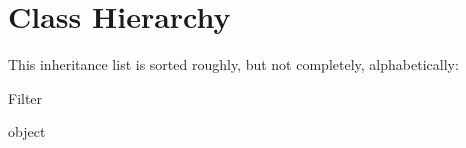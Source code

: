 \section{Class Hierarchy}
This inheritance list is sorted roughly, but not completely, alphabetically\+:\begin{DoxyCompactList}
\item {}
\item Filter\begin{DoxyCompactList}
\item {}
\end{DoxyCompactList}
\item {}
\item object\begin{DoxyCompactList}
\item {}
\end{DoxyCompactList}
\end{DoxyCompactList}
